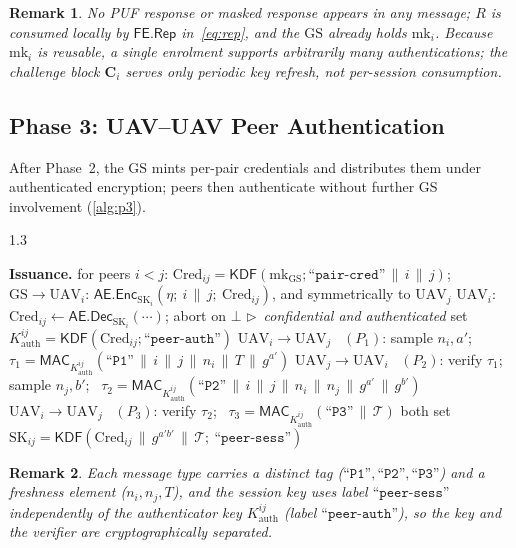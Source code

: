 \documentclass[11pt,a4paper]{article}
\theoremstyle{jrnlplain}
\theoremstyle{jrnldef}
\newtheorem{remark}{Remark}
\newcommand{\GS}{\mathrm{GS}}
\newcommand{\UAV}{\mathrm{UAV}}
\newcommand{\Cred}{\mathrm{Cred}}
\newcommand{\mk}{\mathrm{mk}}
\newcommand{\SK}{\mathrm{SK}}
\newcommand{\MAC}{\mathsf{MAC}}
\newcommand{\aead}{\mathsf{AE}}
\newcommand{\Enc}{\mathsf{Enc}}
\newcommand{\Dec}{\mathsf{Dec}}
\newcommand{\KDF}{\mathsf{KDF}}
\newcommand{\Rep}{\mathsf{Rep}}
\newcommand{\FE}{\mathsf{FE}}
\newcommand{\lbl}[1]{\text{``}\texttt{#1}\text{''}}
\newcommand{\catt}{\,\|\,}
\newcommand{\transcript}{\mathcal{T}}
\newcommand{\cmnt}[1]{\hfill\ensuremath{\triangleright}~\textit{#1}}
\begin{document}
\begin{remark}
No PUF response or masked response appears in any message; $R$ is consumed
locally by $\FE.\Rep$ in~\eqref{eq:rep}, and the $\GS$ already holds $\mk_i$.
Because $\mk_i$ is reusable, a single enrolment supports arbitrarily many
authentications; the challenge block $\bm{C}_i$ serves only periodic key
refresh, not per-session consumption.
\end{remark}

\subsection{Phase 3: UAV--UAV Peer Authentication}
\label{sec:p3}
After Phase~2, the $\GS$ mints per-pair credentials and distributes them under
authenticated encryption; peers then authenticate without further GS
involvement (\cref{alg:p3}).

\begin{algorithm}[t]
\caption{Phase 3 --- Per-pair credential issuance and peer handshake}
\label{alg:p3}
\begin{spacing}{1.3}
\begin{algorithmic}[1]
\STATE \textbf{Issuance.} for peers $i<j$: $\Cred_{ij}=\KDF(\mk_{\GS};\lbl{pair-cred}\catt i\catt j)$; \ $\GS\!\to\!\UAV_i$: $\aead.\Enc_{\SK_i}(\eta;\ i\catt j;\ \Cred_{ij})$, and symmetrically to $\UAV_j$
\STATE $\UAV_i$: $\Cred_{ij}\gets\aead.\Dec_{\SK_i}(\cdots)$; abort on $\bot$ \cmnt{confidential and authenticated}
\STATE set $K^{ij}_{\mathrm{auth}}=\KDF(\Cred_{ij};\lbl{peer-auth})$
\STATE $\UAV_i\!\to\!\UAV_j$ \ $(P_1)$: sample $n_i,a'$; \ $\tau_1=\MAC_{K^{ij}_{\mathrm{auth}}}(\lbl{P1}\catt i\catt j\catt n_i\catt T\catt g^{a'})$
\STATE $\UAV_j\!\to\!\UAV_i$ \ $(P_2)$: verify $\tau_1$; sample $n_j,b'$; \ $\tau_2=\MAC_{K^{ij}_{\mathrm{auth}}}(\lbl{P2}\catt i\catt j\catt n_i\catt n_j\catt g^{a'}\catt g^{b'})$
\STATE $\UAV_i\!\to\!\UAV_j$ \ $(P_3)$: verify $\tau_2$; \ $\tau_3=\MAC_{K^{ij}_{\mathrm{auth}}}(\lbl{P3}\catt\transcript)$
\STATE both set $\SK_{ij}=\KDF(\Cred_{ij}\catt g^{a'b'}\catt\transcript;\ \lbl{peer-sess})$
\end{algorithmic}
\end{spacing}
\end{algorithm}

\begin{remark}
Each message type carries a distinct tag ($\lbl{P1},\lbl{P2},\lbl{P3}$) and a
freshness element ($n_i,n_j,T$), and the session key uses label
$\lbl{peer-sess}$ independently of the authenticator key
$K^{ij}_{\mathrm{auth}}$ (label $\lbl{peer-auth}$), so the key and the
verifier are cryptographically separated.
\end{remark}
\end{document}
